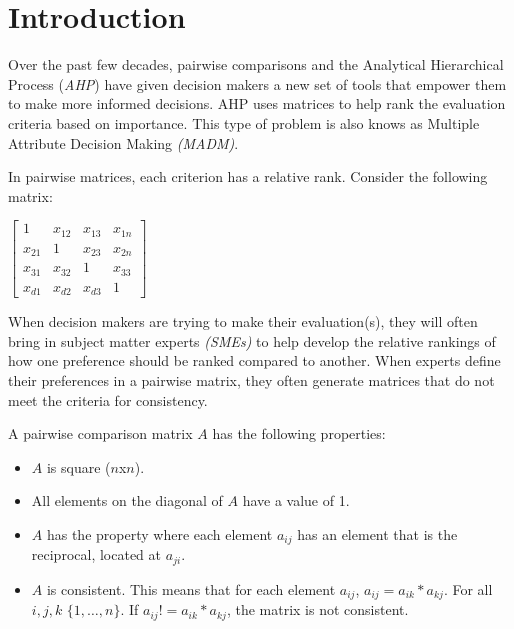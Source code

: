 \documentclass[12pt]{amsart}
\theoremstyle{definition}
\begin{document}
\newpage
\tableofcontents
\newpage
\newpage



\section{Introduction}

Over the past few decades, pairwise comparisons and the Analytical Hierarchical Process (\textit{AHP}) have given decision makers a new set of tools that empower them to make more informed decisions.  AHP uses matrices to help rank the evaluation criteria based on importance.  This type of problem is also knows as Multiple Attribute Decision Making \textit{(MADM)}.

In pairwise matrices, each criterion has a relative rank.  Consider the following matrix:
\begin{center}
$
\begin{bmatrix}
    1 & x_{12} & x_{13} & x_{1n} \\
    x_{21} & 1 & x_{23} & x_{2n} \\
    x_{31} & x_{32} & 1 & x_{33} \\
    x_{d1} & x_{d2} & x_{d3} & 1
\end{bmatrix}
$
\end{center}

When decision makers are trying to make their evaluation(s), they will often bring in subject matter experts \textit{(SMEs)} to help develop the relative rankings of how one preference should be ranked compared to another.  When experts define their preferences in a pairwise matrix, they often generate matrices that do not meet the criteria for consistency.

\newpage
A pairwise comparison matrix $A$ has the following properties:
\begin{itemize}
\item $A$ is square ($n$x$n$).
\item All elements on the diagonal of $A$ have a value of 1.
\item $A$ has the property where each element $a_{ij}$ has an element that is the reciprocal, located at $a_{ji}$.
\item $A$ is consistent.  This means that for each element $a_{ij}$, $a_{ij}=a_{ik}*a_{kj}$.  For all $i,j,k$ $\{1,\dots,n\}$. If $a_{ij}!=a_{ik}*a_{kj}$, the matrix is not consistent.
\end{itemize}
\end{document}
